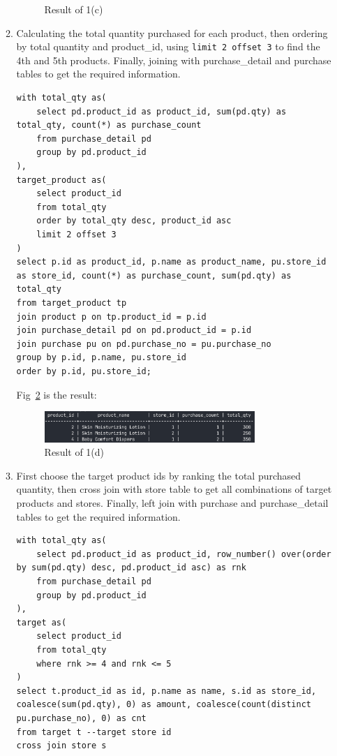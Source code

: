 \documentclass[12pt,a4paper]{article}
\begin{document}
\begin{enumerate}
\begin{enumerate}
\begin{figure}[H]
            \caption{Result of 1(c)}
            \label{fig:1c}
        \end{figure}
        \item Calculating the total quantity purchased for each product, then ordering by total quantity and product\_id, using \texttt{limit 2 offset 3} to find the 4th and 5th products. Finally, joining with purchase\_detail and purchase tables to get the required information.
        \begin{verbatim}
with total_qty as(
    select pd.product_id as product_id, sum(pd.qty) as total_qty, count(*) as purchase_count
    from purchase_detail pd
    group by pd.product_id
),
target_product as(
    select product_id
    from total_qty
    order by total_qty desc, product_id asc
    limit 2 offset 3
)
select p.id as product_id, p.name as product_name, pu.store_id as store_id, count(*) as purchase_count, sum(pd.qty) as total_qty
from target_product tp
join product p on tp.product_id = p.id
join purchase_detail pd on pd.product_id = p.id
join purchase pu on pd.purchase_no = pu.purchase_no
group by p.id, p.name, pu.store_id
order by p.id, pu.store_id;
        \end{verbatim}
        Fig~\ref{fig:1d} is the result:
        \begin{figure}[H]
            \centering
            \includegraphics[width=0.8\textwidth]{src/1d.png}
            \caption{Result of 1(d)}
            \label{fig:1d}
        \end{figure}
        \item First choose the target product ids by ranking the total purchased quantity, then cross join with store table to get all combinations of target products and stores. Finally, left join with purchase and purchase\_detail tables to get the required information.
        \begin{verbatim}
with total_qty as(
    select pd.product_id as product_id, row_number() over(order by sum(pd.qty) desc, pd.product_id asc) as rnk
    from purchase_detail pd
    group by pd.product_id
),
target as(
    select product_id
    from total_qty 
    where rnk >= 4 and rnk <= 5
)
select t.product_id as id, p.name as name, s.id as store_id, coalesce(sum(pd.qty), 0) as amount, coalesce(count(distinct pu.purchase_no), 0) as cnt
from target t --target store id
cross join store s

\end{verbatim}
\end{enumerate}
\end{enumerate}
\end{document}
